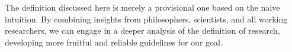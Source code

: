 
The definition discussed here is merely a provisional one based on the naive intuition. By combining insights from philosophers, scientists, and all working researchers, we can engage in a deeper analysis of the definition of research, developing more fruitful and reliable guidelines for our goal.



